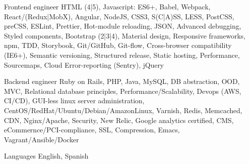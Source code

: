 


\begin{cvskills}



  \cvskill
    {Frontend engineer} %
    {HTML (4|5), Javascript: ES6+, Babel, Webpack, React/(Redux|MobX), Angular, NodeJS, CSS3, S(C|A)SS, LESS, PostCSS, preCSS, ESLint, Prettier, Hot-module reloading, JSON, Advanced debugging, Styled components, Bootstrap (2|3|4), Material design, Responsive frameworks, npm, TDD, Storybook, Git/GitHub, Git-flow, Cross-browser compatibility (IE6+), Semantic versioning, Structured release, Static hosting, Performance, Sourcemaps, Cloud Error-reporting (Sentry), jQuery} %


  \cvskill
    {Backend engineer} %
    {Ruby on Rails, PHP, Java, MySQL, DB abstraction, OOD, MVC, Relational database principles, Performance/Scalability, Devops (AWS, CI/CD), GUI-less linux server administration, CentOS/RedHat/Ubuntu/Debian/AmazonLinux, Varnish, Redis, Memcached, CDN, Nginx/Apache, Security, New Relic, Google analytics certified, CMS, eCommernce/PCI-compliance, SSL, Compression, Emacs, Vagrant/Ansible/Docker} %





  \cvskill
    {Languages} %
    {English, Spanish} %



\end{cvskills}

